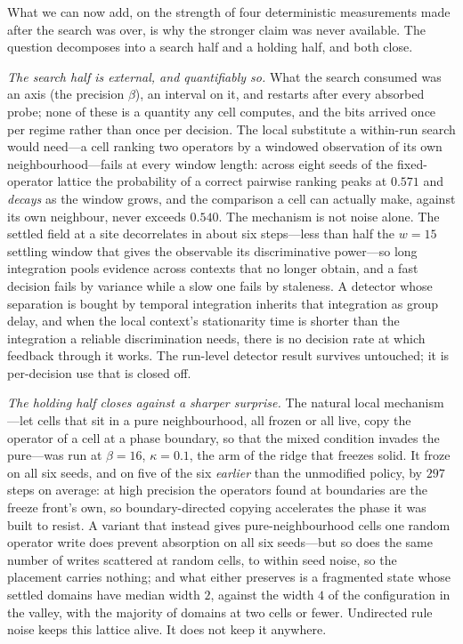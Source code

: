What we can now add, on the strength of four deterministic measurements made
after the search was over, is why the stronger claim was never available. The
question decomposes into a search half and a holding half, and both close.

\emph{The search half is external, and quantifiably so.} What the search
consumed was an axis (the precision $\beta$), an interval on it, and restarts
after every absorbed probe; none of these is a quantity any cell computes, and
the bits arrived once per regime rather than once per decision. The local
substitute a within-run search would need---a cell ranking two operators by a
windowed observation of its own neighbourhood---fails at every window length:
across eight seeds of the fixed-operator lattice the probability of a correct
pairwise ranking peaks at $0.571$ and \emph{decays} as the window grows, and
the comparison a cell can actually make, against its own neighbour, never
exceeds $0.540$. The mechanism is not noise alone. The settled field at a site
decorrelates in about six steps---less than half the $w = 15$ settling window
that gives the observable its discriminative power---so long integration pools
evidence across contexts that no longer obtain, and a fast decision fails by
variance while a slow one fails by staleness. A detector whose separation is
bought by temporal integration inherits that integration as group delay, and
when the local context's stationarity time is shorter than the integration a
reliable discrimination needs, there is no decision rate at which feedback
through it works. The run-level detector result survives untouched; it is
per-decision use that is closed off.

\emph{The holding half closes against a sharper surprise.} The natural local
mechanism---let cells that sit in a pure neighbourhood, all frozen or all
live, copy the operator of a cell at a phase boundary, so that the mixed
condition invades the pure---was run at $\beta = 16$, $\kappa = 0.1$, the arm
of the ridge that freezes solid. It froze on all six seeds, and on five of the
six \emph{earlier} than the unmodified policy, by $297$ steps on average: at
high precision the operators found at boundaries are the freeze front's own,
so boundary-directed copying accelerates the phase it was built to resist. A
variant that instead gives pure-neighbourhood cells one random operator write
does prevent absorption on all six seeds---but so does the same number of
writes scattered at random cells, to within seed noise, so the placement
carries nothing; and what either preserves is a fragmented state whose settled
domains have median width $2$, against the width $4$ of the configuration in
the valley, with the majority of domains at two cells or fewer. Undirected
rule noise keeps this lattice alive. It does not keep it anywhere.

